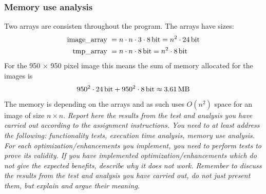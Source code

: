 \documentclass[a4paper, english]{article}
\numberwithin{equation}{section}
\begin{document}
\subsubsection{Memory use analysis}
Two arrays are consisten throughout the program. The arrays have sizes:
\begin{align}
    \text{image\_array} \  & = n \cdot n \cdot 3 \cdot \SI{8}{\bit} = n^2 \cdot \SI{24}{\bit} \\
    \text{tmp\_array} \    & = n \cdot n \cdot \SI{8}{\bit} = n^2 \cdot \SI{8}{\bit}
\end{align}
For the 950 \(\times\) 950 pixel image this means the sum of memory allocated for the images is
\begin{align}
    950^2 \cdot \SI{24}{\bit} + 950^2 \cdot \SI{8}{\bit} \approx \SI{3.61}{\mega\byte}
\end{align}
The memory is depending on the arrays and as such uses \(O(n^2)\) space for an image of size \(n\times n\).
\textit{Report here the results from the test and analysis you have carried out according to the assignment instructions.  You need to at least address the following: functionality tests, execution time analysis, memory use analysis.
    For each optimization/enhancements you implement, you need to perform tests to prove its validity. If you have implemented optimization/enhancements which do not give the expected benefits, describe why it does not work.
    Remember to discuss the results from the test and analysis you have carried out, do not just present them, but explain and argue their meaning.}

%
%




%
\end{document}
